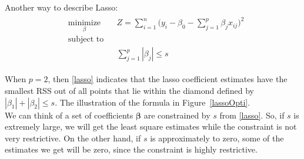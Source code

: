 \documentclass[12pt,a4paper]{article}%
\theoremstyle{definition}
\theoremstyle{plain}
\numberwithin{equation}{section}
\begin{document}
Another way to describe Lasso:
\begin{equation}
\begin{aligned}
\begin{split}
& \underset{\beta}{\text{minimize}} & & Z = \sum\limits_{i=1}^{n} \bigg( y_{i}-\beta_{0}- \sum\limits_{j=1}^{p}\beta_{j}x_{ij} \bigg)^{2} \\
& \text{subject to} 				& & \\
& & & \sum\limits_{j=1}^{p}|\beta_{j}| \leq s
\end{split}
\end{aligned}
\label{lasso}
\end{equation}

When $p=2$, then \eqref{lasso} indicates that the lasso coefficient estimates have the smallest RSS out of all points that lie within the diamond defined by $|\beta_{1}|+|\beta_{2}| \leq s$. 
The illustration of the formula in Figure~\ref{lassoOpti}. \\

We can think of a set of coefficients $\boldsymbol\beta$ are constrained by $s$ from \eqref{lasso}. 
So, if $s$ is extremely large, we will get the least square estimates while the constraint is not very restrictive.
On the other hand, if $s$ is approximately to zero, some of the estimates we get will be zero, since the constraint is highly restrictive. 

\end{document}
